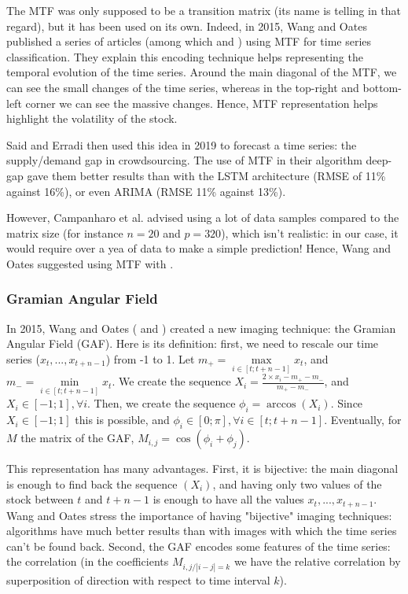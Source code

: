 \documentclass[11pt]{article}
\begin{document}
\begin{onehalfspace}
The MTF was only supposed to be a transition matrix (its name is telling in that regard), but it has been used on its own. Indeed, in 2015, Wang and Oates published a series of articles (among which \cite{wang} and \cite{wang_encod}) using MTF for time series classification. They explain this encoding technique helps representing the temporal evolution of the time series. Around the main diagonal of the MTF, we can see the small changes of the time series, whereas in the top-right and bottom-left corner we can see the massive changes. Hence, MTF representation helps highlight the volatility of the stock. 

Said and Erradi \cite{said} then used this idea in 2019 to forecast a time series: the supply/demand gap in crowdsourcing. The use of MTF in their algorithm deep-gap gave them better results than with the LSTM architecture (RMSE of 11\% against 16\%), or even ARIMA (RMSE 11\% against 13\%).

However, Campanharo et al. \cite{campanharo} advised using a lot of data samples compared to the matrix size (for instance $n = 20$ and $p = 320$), which isn't realistic: in our case, it would require over a yea of data to make a simple prediction! Hence, Wang and Oates \cite{wang_encod} suggested using MTF with .

\subsubsection{Gramian Angular Field}
\label{gaf}

In 2015, Wang and Oates (\cite{wang_encod} and \cite{wang}) created a new imaging technique: the Gramian Angular Field (GAF). Here is its definition: first, we need to rescale our time series ($x_t, ..., x_{t+n-1}$) from -1 to 1. Let $m_+ = \max\limits_{i \in [t; t+n-1]} x_t$, and $m_- = \min\limits_{i \in [t; t+n-1]} x_t$. We create the sequence $X_i = \frac{2 \times x_i - m_+ - m_-}{m_+ - m_-}$, and $X_i \in [-1;1], \forall i$. Then, we create the sequence $\phi_i = \arccos(X_i)$. Since $X_i \in [-1;1]$ this is possible, and $\phi_i \in [0;\pi], \forall i \in [t;t+n-1]$. Eventually, for $M$ the matrix of the GAF, $M_{i,j} = \cos(\phi_i + \phi_j)$.

This representation has many advantages. First, it is bijective: the main diagonal is enough to find back the sequence $(X_i)$, and having only two values of the stock between $t$ and $t+n-1$ is enough to have all the values $x_t, ..., x_{t+n-1}$. Wang and Oates stress the importance of having "bijective" imaging techniques: algorithms have much better results than with images with which the time series can't be found back. Second, the GAF encodes some features of the time series: the correlation (in the coefficients $M_{i,j / |i-j| = k}$ we have the relative correlation by superposition of direction with respect to time interval $k$).


\end{onehalfspace}
\end{document}
